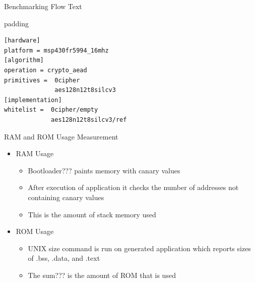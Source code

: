 \documentclass[xcolor=pdftex,dvipsnames,table,final]{beamer}
\begin{document}
\begin{frame}[fragile]{}
\begin{columns}[t, totalwidth=\textwidth]
\begin{column}{.675\linewidth}
\begin{columns}
\begin{column}{.473\linewidth}
      \begin{block}{Benchmarking Flow}
        Text
          \begin{center}
            \begin{minipage}{0.9\linewidth}
            \begin{beamercolorbox}[rounded=true]{padding}%
               \footnotesize%
              \begin{lstlisting}
[hardware]
platform = msp430fr5994_16mhz
[algorithm]
operation = crypto_aead
primitives =  0cipher
              aes128n12t8silcv3
[implementation]
whitelist =  0cipher/empty
             aes128n12t8silcv3/ref
              \end{lstlisting}
            \end{beamercolorbox}
            \end{minipage}%
          \end{center}
      \end{block}
     
      \begin{block}{RAM and ROM Usage Measurement}
        \begin{itemize}
          \item RAM Usage
            \begin{itemize}
              \item {\color{red}Bootloader???} paints memory with canary values
              \item After execution of application it checks
                    the number of addresses not containing canary values
              \item This is the amount of stack memory used
            \end{itemize}
          \item ROM Usage
            \begin{itemize}
              \item UNIX size command is run on generated application which
                    reports sizes of .bss, .data, and .text
              \item The {\color{red}sum???} is the amount of ROM that is used
            \end{itemize}
        \end{itemize}

      \end{block}


\end{column}
\end{columns}
\end{column}
\end{columns}
\end{frame}
\end{document}
